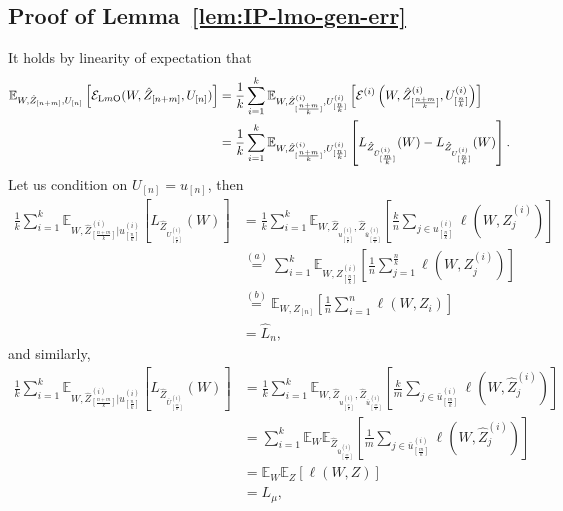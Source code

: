 \documentclass[onecolumn,romanappendices,10pt]{IEEEtran}
\newcommand{\Ecal}{{\mathcal E}}
\newcommand{\EE}{{\mathbb{E}}}
\begin{document}
	\subsection{Proof of Lemma~\ref{lem:IP-lmo-gen-err}} \label{appsub:lemma1}
	It holds by linearity of expectation that
	\begin{equation}
		\begin{aligned}
			\EE_{W, \hat{Z}_{[n+m]}, U_{[n]}} \left[ \Ecal_{\textnormal{L$m$O}}( W, \hat{Z}_{[n+m]}, U_{[n]} ) \right] &= \frac{1}{k} \sum_{i=1}^{k} \EE_{W, \hat{Z}^{(i)}_{[\frac{n+m}{k}]}, U^{(i)}_{[\frac{n}{k}]}} \left[ \Ecal^{(i)}\left( W, \hat{Z}^{(i)}_{[\frac{n+m}{k}]}, U^{(i)}_{[\frac{n}{k}]} \right) \right] \\
			&= \frac{1}{k} \sum_{i=1}^{k} \EE_{W, \hat{Z}^{(i)}_{[\frac{n+m}{k}]}, U^{(i)}_{[\frac{n}{k}]}} \left[ L_{\hat{Z}_{\bar{U}^{(i)}_{[\frac{m}{k}]}}}(W) - L_{\hat{Z}_{U^{(i)}_{[\frac{n}{k}]}}}(W) \right].
		\end{aligned}
	\end{equation}
	Let us condition on $U_{[n]} = u_{[n]}$, then
	\begin{equation}
		\begin{aligned}
			\frac{1}{k} \sum_{i=1}^{k} \EE_{W, \hat{Z}^{(i)}_{[\frac{n+m}{k}]} | u^{(i)}_{[\frac{n}{k}]}} \left[ L_{\hat{Z}_{U^{(i)}_{[\frac{n}{k}]}}}(W) \right] &= \frac{1}{k} \sum_{i=1}^{k} \EE_{W, \hat{Z}_{u^{(i)}_{[\frac{n}{k}]}}, \hat{Z}_{\bar{u}^{(i)}_{[\frac{m}{k}]}}} \left[ \frac{k}{n} \sum_{j \in u^{(i)}_{[\frac{n}{k}]}} \ell(W, \hat{Z}^{(i)}_j) \right] \\
			&\overset{(a)}{=} \sum_{i=1}^{k} \EE_{W, Z^{(i)}_{[\frac{n}{k}]}} \left[ \frac{1}{n} \sum_{j = 1}^{\frac{n}{k}} \ell(W, Z^{(i)}_j) \right] \\
			&\overset{(b)}{=} \EE_{W, Z_{[n]}} \left[ \frac{1}{n} \sum_{i = 1}^{n} \ell(W, Z_i) \right] \\
			&= \widehat{L}_n,
		\end{aligned}
	\end{equation}
	and similarly,
	\begin{equation}
		\begin{aligned}
			\frac{1}{k} \sum_{i=1}^{k} \EE_{W, \hat{Z}^{(i)}_{[\frac{n+m}{k}]} | u^{(i)}_{[\frac{n}{k}]}} \left[ L_{\hat{Z}_{\bar{U}^{(i)}_{[\frac{m}{k}]}}}(W) \right] &= \frac{1}{k} \sum_{i=1}^{k} \EE_{W, \hat{Z}_{u^{(i)}_{[\frac{n}{k}]}}, \hat{Z}_{\bar{u}^{(i)}_{[\frac{m}{k}]}}} \left[ \frac{k}{m} \sum_{j \in \bar{u}^{(i)}_{[\frac{m}{k}]}} \ell(W, \hat{Z}^{(i)}_j) \right] \\
			&= \sum_{i=1}^{k} \EE_{W} \EE_{\hat{Z}_{\bar{u}^{(i)}_{[\frac{m}{k}]}}} \left[ \frac{1}{m} \sum_{j \in \bar{u}^{(i)}_{[\frac{m}{k}]}} \ell(W, \hat{Z}^{(i)}_j) \right] \\
			&= \EE_{W} \EE_{Z} \left[ \ell(W, Z) \right] \\
			&= L_\mu,
		\end{aligned}
	\end{equation}
\end{document}
